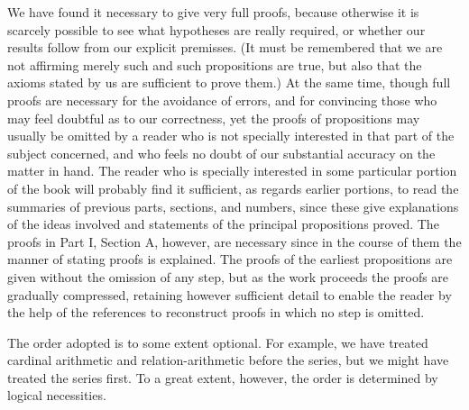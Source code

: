 \documentclass{scrartcl}
\begin{document}
We have found it necessary to give very full proofs, because otherwise it is scarcely possible to see what hypotheses are really required, or whether our results
follow from our explicit premisses. (It must be remembered that we are not affirming merely such and such propositions are true, but also that the axioms stated
by us are sufficient to prove them.) At the same time, though full proofs are necessary for the avoidance of errors, and for convincing those who may feel doubtful
as to our correctness, yet the proofs of propositions may usually be omitted by a reader who is not specially interested in that part of the subject concerned,
and who feels no doubt of our substantial accuracy on the matter in hand. The reader who is specially interested in some particular portion of the book will probably
find it sufficient, as regards earlier portions, to read the summaries of previous parts, sections, and numbers, since these give explanations of the ideas
involved and statements of the principal propositions proved. The proofs in Part I, Section A, however, are necessary since in the course of them the manner
of stating proofs is explained. The proofs of the earliest propositions are given without the omission of any step, but as the work proceeds the proofs are gradually
compressed, retaining however sufficient detail to enable the reader by the help of the references to reconstruct proofs in which no step is omitted.

The order adopted is to some extent optional. For example, we have treated cardinal arithmetic and relation-arithmetic before the series, but we might have treated
the series first. To a great extent, however, the order is determined by logical necessities.
\end{document}
